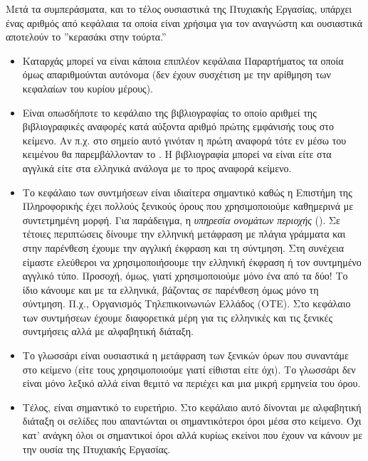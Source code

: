 Μετά τα συμπεράσματα, και το τέλος ουσιαστικά της Πτυχιακής Εργασίας,
υπάρχει ένας αριθμός από κεφάλαια τα οποία είναι χρήσιμα για τον αναγνώστη
και ουσιαστικά αποτελούν το ''κερασάκι στην τούρτα.''

\begin{itemize}
\item
Καταρχάς μπορεί να είναι κάποια επιπλέον κεφάλαια Παραρτήματος τα
οποία όμως απαριθμούνται αυτόνομα (δεν έχουν συσχέτιση με την
αρίθμηση των κεφαλαίων του κυρίου μέρους).
\item
Είναι οπωσδήποτε το κεφάλαιο της βιβλιογραφίας το οποίο αριθμεί της 
βιβλιογραφικές αναφορές κατά αύξοντα αριθμό πρώτης εμφάνισής τους στο κείμενο.
Αν π.χ. στο σημείο αυτό γινόταν η πρώτη αναφορά τότε εν μέσω του κειμένου
θα παρεμβάλλονταν το \cite{example}.
Η βιβλιογραφία μπορεί να είναι είτε στα αγγλικά είτε στα ελληνικά
ανάλογα με το προς αναφορά κείμενο.
\item
Το κεφάλαιο των συντμήσεων είναι ιδιαίτερα σημαντικό καθώς η Επιστήμη
της Πληροφορικής έχει πολλούς ξενικούς όρους που χρησιμοποιούμε καθημερινά με συντετμημένη
μορφή. Για παράδειγμα, η \textit{υπηρεσία ονομάτων περιοχής} ().
Σε τέτοιες περιπτώσεις δίνουμε την ελληνική μετάφραση με πλάγια γράμματα και
στην παρένθεση έχουμε την αγγλική έκφραση και τη σύντμηση. Στη συνέχεια
είμαστε ελεύθεροι να χρησιμοποιήσουμε την ελληνική έκφραση ή τον συντμημένο 
αγγλικό τύπο. Προσοχή, όμως, γιατί χρησιμοποιούμε μόνο ένα από τα δύο! 
Το ίδιο κάνουμε και με τα ελληνικά, βάζοντας σε παρένθεση όμως μόνο τη
σύντμηση. Π.χ., Οργανισμός Τηλεπικοινωνιών Ελλάδος (ΟΤΕ). 
Στο κεφάλαιο των συντμήσεων έχουμε διαφορετικά μέρη για τις ελληνικές
και τις ξενικές συντμήσεις αλλά με αλφαβητική διάταξη.
\item
Το γλωσσάρι είναι ουσιαστικά η μετάφραση των ξενικών όρων
που συναντάμε στο κείμενο (είτε τους χρησιμοποιούμε γιατί
είθισται είτε όχι). Το γλωσσάρι δεν είναι μόνο λεξικό αλλά
είναι θεμιτό να περιέχει και μια μικρή ερμηνεία του όρου.
\item
Τέλος, είναι σημαντικό το ευρετήριο.   
Στο κεφάλαιο αυτό δίνονται με αλφαβητική διάταξη οι σελίδες που απαντώνται οι
σημαντικότεροι όροι μέσα στο κείμενο. Όχι κατ' ανάγκη όλοι οι σημαντικοί
όροι αλλά κυρίως εκείνοι που έχουν να κάνουν με την ουσία της Πτυχιακής Εργασίας.
\end{itemize} 



 
